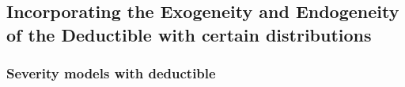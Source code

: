 \documentclass[11pt]{article}
\begin{document}




\subsection{Incorporating the Exogeneity and Endogeneity of the Deductible with certain distributions}\label{section:exoendo}

\subsubsection{Severity models with deductible}
\end{document}
